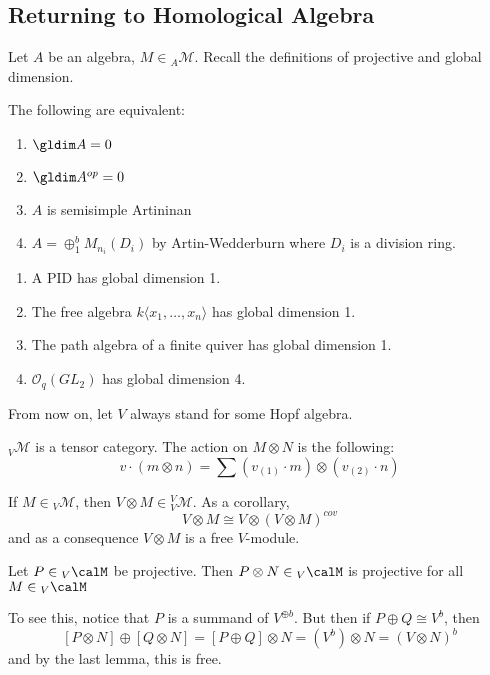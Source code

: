 \documentclass[12pt]{article}
\begin{document}
\subsection{Returning to Homological Algebra}
Let $A$ be an algebra, $M\in {_A\mathcal{M}}$. Recall the definitions of projective and global dimension.
\begin{rmk}
	The following are equivalent:
	\begin{enumerate}
		\item $\gldim A=0$
		\item $\gldim A^{op}=0$
		\item $A$ is semisimple Artininan
		\item $A=\oplus_1^b M_{n_i}(D_i)$ by Artin-Wedderburn where $D_i$ is a division ring.
	\end{enumerate}
\end{rmk}
\begin{rmk}
	\begin{enumerate}
		\item A PID has global dimension 1. 
		\item The free algebra $k\langle x_1,\dots,x_n\rangle$ has global dimension 1.
		\item The path algebra of a finite quiver has global dimension 1.
		\item $\mathcal{O}_q(GL_2)$ has global dimension 4.
	\end{enumerate}
\end{rmk}

From now on, let $V$ always stand for some Hopf algebra.
\begin{lem}
	${_V\mathcal{M}}$ is a tensor category. The action on $M\otimes N$ is the following:
	\[v\cdot (m\otimes n)=\sum (v_{(1)}\cdot m)\otimes (v_{(2)}\cdot n)\]
\end{lem}
\begin{lem}
	If $M\in {_V\mathcal{M}}$, then $V\otimes M\in {_V^V\mathcal{M}}$. As a corollary,
	\[V\otimes M\cong V\otimes (V\otimes M)^{cov}\]
	and as a consequence $V\otimes M$ is a free $V$-module.
\end{lem}

\begin{thm}
	Let $P\in {_V\calM}$ be projective. Then $P\otimes N\in {_V\calM}$ is projective for all $M\in{_V\calM}$
\end{thm}
\begin{prf}
	To see this, notice that $P$ is a summand of $V^{\oplus b}$. But then if $P\oplus Q\cong V^{b}$, then 
	\[[P\otimes N]\oplus[Q\otimes N]=[P\oplus Q]\otimes N=(V^b)\otimes N=(V\otimes N)^b\]
	and by the last lemma, this is free.
\end{prf}
\end{document}
